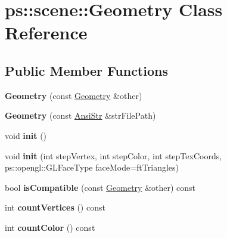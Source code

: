 \hypertarget{classps_1_1scene_1_1Geometry}{}\section{ps\+:\+:scene\+:\+:Geometry Class Reference}
\label{classps_1_1scene_1_1Geometry}
\subsection*{Public Member Functions}
\begin{DoxyCompactItemize}
\item 
\hypertarget{classps_1_1scene_1_1Geometry_a2d4f58b106041e3a758086577366aa9e}{}{\bfseries Geometry} (const \hyperlink{classps_1_1scene_1_1Geometry}{Geometry} \&other)\label{classps_1_1scene_1_1Geometry_a2d4f58b106041e3a758086577366aa9e}

\item 
\hypertarget{classps_1_1scene_1_1Geometry_af119f2be0cff8974051dfca0371b11bc}{}{\bfseries Geometry} (const \hyperlink{classps_1_1base_1_1CAString}{Ansi\+Str} \&str\+File\+Path)\label{classps_1_1scene_1_1Geometry_af119f2be0cff8974051dfca0371b11bc}

\item 
\hypertarget{classps_1_1scene_1_1Geometry_a82f44380754747b70333fa1f8bb6f320}{}void {\bfseries init} ()\label{classps_1_1scene_1_1Geometry_a82f44380754747b70333fa1f8bb6f320}

\item 
\hypertarget{classps_1_1scene_1_1Geometry_a9bfe3529ee6f25c12fbf87606b03ebab}{}void {\bfseries init} (int step\+Vertex, int step\+Color, int step\+Tex\+Coords, ps\+::opengl\+::\+G\+L\+Face\+Type face\+Mode=ft\+Triangles)\label{classps_1_1scene_1_1Geometry_a9bfe3529ee6f25c12fbf87606b03ebab}

\item 
\hypertarget{classps_1_1scene_1_1Geometry_a47cb57a90830d8e1982430174442c641}{}bool {\bfseries is\+Compatible} (const \hyperlink{classps_1_1scene_1_1Geometry}{Geometry} \&other) const \label{classps_1_1scene_1_1Geometry_a47cb57a90830d8e1982430174442c641}

\item 
\hypertarget{classps_1_1scene_1_1Geometry_a649e3aa04db6c185fed04c29d4e9a0ca}{}int {\bfseries count\+Vertices} () const \label{classps_1_1scene_1_1Geometry_a649e3aa04db6c185fed04c29d4e9a0ca}

\item 
\hypertarget{classps_1_1scene_1_1Geometry_a7f2f57051355459e6058794e99791336}{}int {\bfseries count\+Color} () const \label{classps_1_1scene_1_1Geometry_a7f2f57051355459e6058794e99791336}


\end{DoxyCompactItemize}
